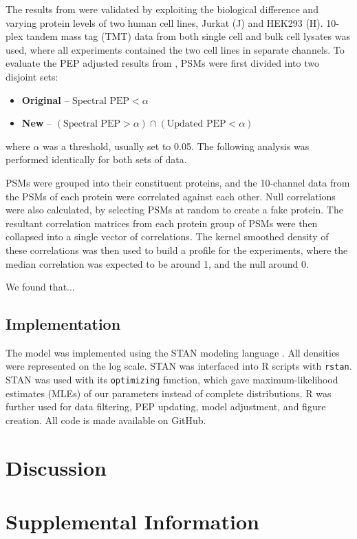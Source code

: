 \begin{spacing}{1.55}
The results from \methodname\; were validated by exploiting the biological difference and varying protein levels of two human cell lines, Jurkat (J) and HEK293 (H). 10-plex tandem mass tag (TMT) data from both single cell and bulk cell lysates was used, where all experiments contained the two cell lines in separate channels. To evaluate the PEP adjusted results from \methodname, PSMs were first divided into two disjoint sets:

\begin{itemize}
\item \textbf{Original} -- $\mbox{Spectral PEP} < \alpha$
\item \textbf{New} -- $(\mbox{Spectral PEP} > \alpha) \cap (\mbox{Updated PEP} < \alpha)$
\end{itemize}
where $\alpha$ was a threshold, usually set to 0.05. The following analysis was performed identically for both sets of data.

PSMs were grouped into their constituent proteins, and the 10-channel data from the PSMs of each protein were correlated against each other. Null correlations were also calculated, by selecting PSMs at random to create a fake protein. The resultant correlation matrices from each protein group of PSMs were then collapsed into a single vector of correlations. The kernel smoothed density of these correlations was then used to build a profile for the experiments, where the median correlation was expected to be around 1, and the null around 0.

We found that...


\subsection{Implementation}

The model was implemented using the STAN modeling language \citep{carpenter2017stan}.  All densities were represented on the log scale. STAN was interfaced into R scripts with \texttt{rstan}. STAN was used with its \texttt{optimizing} function, which gave maximum-likelihood estimates (MLEs) of our parameters instead of complete distributions. R was further used for data filtering, PEP updating, model adjustment, and figure creation. All code is made available on GitHub.

\section{Discussion}

\section{Supplemental Information}


\end{spacing}
